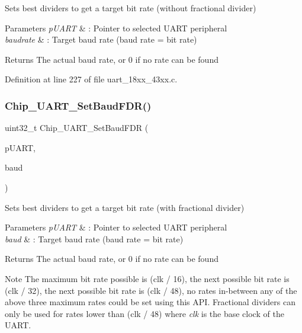 Sets best dividers to get a target bit rate (without fractional divider) 


\begin{DoxyParams}{Parameters}
{\em p\+U\+A\+RT} & \+: Pointer to selected U\+A\+RT peripheral \\
\hline
{\em baudrate} & \+: Target baud rate (baud rate = bit rate) \\
\hline
\end{DoxyParams}
\begin{DoxyReturn}{Returns}
The actual baud rate, or 0 if no rate can be found 
\end{DoxyReturn}


Definition at line 227 of file uart\+\_\+18xx\+\_\+43xx.\+c.

\mbox{\label{group___u_a_r_t__18_x_x__43_x_x_gaf8be13555496e013bb747c19134db9e1}} 
\subsubsection{\texorpdfstring{Chip\+\_\+\+U\+A\+R\+T\+\_\+\+Set\+Baud\+F\+D\+R()}{Chip\_UART\_SetBaudFDR()}}
{\footnotesize\ttfamily uint32\+\_\+t Chip\+\_\+\+U\+A\+R\+T\+\_\+\+Set\+Baud\+F\+DR (\begin{DoxyParamCaption}\item[{\hyperlink{struct_l_p_c___u_s_a_r_t___t}{L\+P\+C\+\_\+\+U\+S\+A\+R\+T\+\_\+T} $\ast$}]{p\+U\+A\+RT,  }\item[{uint32\+\_\+t}]{baud }\end{DoxyParamCaption})}



Sets best dividers to get a target bit rate (with fractional divider) 


\begin{DoxyParams}{Parameters}
{\em p\+U\+A\+RT} & \+: Pointer to selected U\+A\+RT peripheral \\
\hline
{\em baud} & \+: Target baud rate (baud rate = bit rate) \\
\hline
\end{DoxyParams}
\begin{DoxyReturn}{Returns}
The actual baud rate, or 0 if no rate can be found 
\end{DoxyReturn}
\begin{DoxyNote}{Note}
The maximum bit rate possible is (clk / 16), the next possible bit rate is (clk / 32), the next possible bit rate is (clk / 48), no rates in-\/between any of the above three maximum rates could be set using this A\+PI. Fractional dividers can only be used for rates lower than (clk / 48) where {\itshape clk} is the base clock of the U\+A\+RT. 
\end{DoxyNote}


